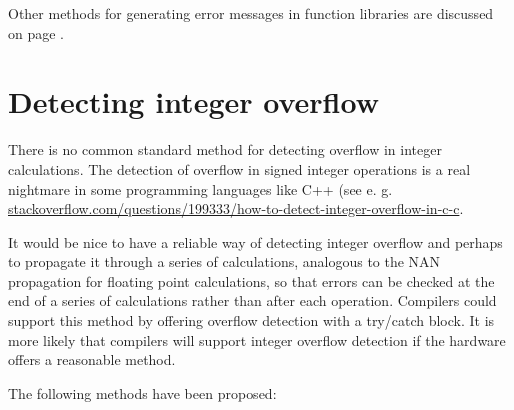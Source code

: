 \documentclass[forwardcom.tex]{subfiles}
\begin{document}
Other methods for generating error messages in function libraries are discussed on page \pageref{errorMessageHandling}.
\vspace{2mm}


\section{Detecting integer overflow} 
\label{integerOverflowDetection}
There is no common standard method for detecting overflow in integer calculations. The detection of overflow in signed integer operations is a real nightmare in some programming languages like C++ (see e. g. \\
\href{http://stackoverflow.com/questions/199333/how-to-detect-integer-overflow-in-c-c}{stackoverflow.com/questions/199333/how-to-detect-integer-overflow-in-c-c}.
\vspace{2mm}

It would be nice to have a reliable way of detecting integer overflow and perhaps to propagate it through a series of calculations, analogous to the NAN propagation for floating point calculations, so that errors can be checked at the end of a series of calculations rather than after each operation. Compilers could support this method by offering overflow detection with a try/catch block. It is more likely that compilers will support integer overflow detection if the hardware offers a reasonable method.
\vspace{2mm}

The following methods have been proposed:
\end{document}
